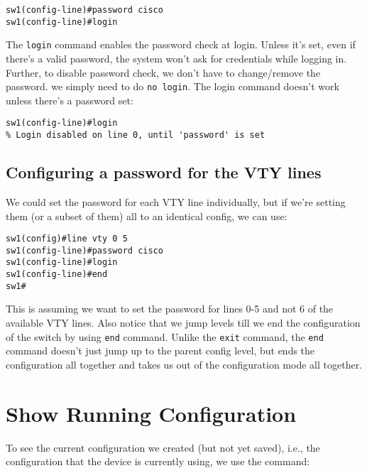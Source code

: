 \vspace{-15pt}
\begin{verbatim}
sw1(config-line)#password cisco
sw1(config-line)#login
\end{verbatim}
\vspace{-10pt}

\noindent
The \verb|login| command enables the password check at login. Unless it's set, even if there's a valid password, the system won't ask for credentials while logging in. Further, to disable password check, we don't have to change/remove the password. we simply need to do \verb|no login|. The login command doesn't work unless there's a password set:

\vspace{-15pt}
\begin{verbatim}
sw1(config-line)#login
% Login disabled on line 0, until 'password' is set
\end{verbatim}
\vspace{-10pt}

\subsection{Configuring a password for the VTY lines}
We could set the password for each VTY line individually, but if we're setting them (or a subset of them) all to an identical config, we can use:

\vspace{-15pt}
\begin{verbatim}
sw1(config)#line vty 0 5
sw1(config-line)#password cisco
sw1(config-line)#login
sw1(config-line)#end
sw1#
\end{verbatim}
\vspace{-10pt}

\noindent
This is assuming we want to set the password for lines 0-5 and not 6 of the available VTY lines. Also notice that we jump levels till we end the configuration of the switch by using \verb|end| command. Unlike the \verb|exit| command, the \verb|end| command doesn't just jump up to the parent config level, but ends the configuration all together and takes us out of the configuration mode all together. 

\section{Show Running Configuration}
To see the current configuration we created (but not yet saved), i.e., the configuration that the device is currently using, we use the command: 

